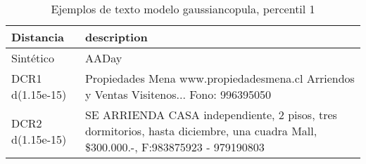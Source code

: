 \begin{table}[H]
\centering
\fontsize{10}{14}\selectfont
\caption{Ejemplos de texto modelo gaussiancopula, percentil 1}
\label{table-example-economicos-b-3-gaussiancopula-1p-text}
\begin{tabular}{|l|m{35em}|}
\hline
\rowcolor[gray]{0.8}
Distancia & description \\
\hline Sintético & AADay \\
\hline DCR1 d(1.15e-15) & Propiedades Mena www.propiedadesmena.cl Arriendos y Ventas Visitenos... Fono: 996395050 \\
\hline DCR2 d(1.15e-15) & SE ARRIENDA CASA independiente, 2 pisos, tres dormitorios, hasta diciembre, una cuadra Mall, \$300.000.-, F:983875923 - 979190803 \\
\hline
\end{tabular}
\end{table}
